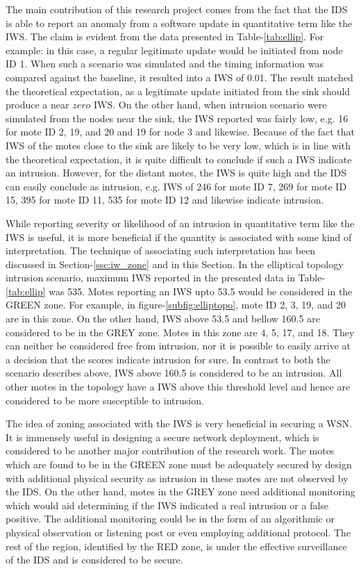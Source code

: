 \documentclass[conference,final]{IEEEtran}
\begin{document}
The main contribution of this research project comes from the fact that the IDS is able to report an anomaly from a software update in quantitative term like the IWS.
The claim is evident from the data presented in Table-\ref{tab:ellip}.
For example: in this case, a regular legitimate update would be initiated from node ID 1. 
When such a scenario was simulated and the timing information was compared against the baseline, it resulted into a IWS of 0.01.
The result matched the theoretical expectation, as a legitimate update initiated from the sink should produce a near $zero$ IWS.
On the other hand, when intrusion scenario were simulated from the nodes near the sink, the IWS reported was fairly low, e.g. 16 for mote ID 2, 19, and 20
 and 19 for node 3 
 and likewise.
Because of the fact that IWS of the motes close to the sink are likely to be very low, which is in line with the theoretical expectation, it is quite difficult to conclude if such a IWS indicate an intrusion. 
However, for the distant motes, the IWS is quite high and the IDS can easily conclude as intrusion, e.g. IWS of 246 for mote ID 7, 269 for mote ID 15, 395 for mote ID 11, 535 for mote ID 12 and likewise indicate intrusion.


While reporting severity or likelihood of an intrusion in quantitative term like the IWS is useful, it is more beneficial if the quantity is associated with some kind of interpretation.
The technique of associating such interpretation has been discussed in Section-\ref{ssc:iw_zone} and in this Section. 
In the elliptical topology intrusion scenario, maximum IWS reported in the presented data in Table-\ref{tab:ellip} was 535. 
Motes reporting an IWS upto 53.5 would be considered in the GREEN zone.
For example, in figure-\ref{subfig:elliptopo}, mote ID 2, 3, 19, and 20 are in this zone.
On the other hand, IWS above 53.5 and bellow 160.5 are considered to be in the GREY zone. 
Motes in this zone are 4, 5, 17, and 18.
They can neither be considered free from intrusion, nor it is possible to easily arrive at a decision that the scores indicate intrusion for sure.
In contrast to both the scenario describes above, IWS above 160.5 is considered to be an intrusion.
All other motes in the topology have a IWS above this threshold level and hence are considered to be more susceptible to intrusion.

The idea of zoning associated with the IWS is very beneficial in securing a WSN.
It is immensely useful in designing a secure network deployment, which is considered to be another major contribution of the research work.
The motes which are found to be in the GREEN zone must be adequately secured by design with additional physical security as intrusion in these motes are not observed by the IDS.
On the other hand, motes in the GREY zone need additional monitoring which would aid determining if the IWS indicated a real intrusion or a false positive.
The additional monitoring could be in the form of an algorithmic or physical observation or listening post or even employing additional protocol.
The rest of the region, identified by the RED zone, is under the effective surveillance of the IDS and is considered to be secure.
\end{document}
